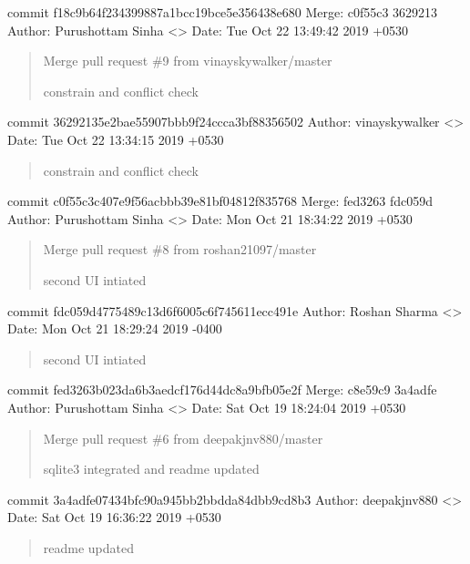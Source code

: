 \documentclass[letterpaper,10pt,english]{sphinxmanual}
\begin{document}
commit f18c9b64f234399887a1bcc19bce5e356438e680
Merge: c0f55c3 3629213
Author: Purushottam Sinha \textless{}\textgreater{}
Date:   Tue Oct 22 13:49:42 2019 +0530
\begin{quote}

Merge pull request \#9 from vinayskywalker/master

constrain and conflict check
\end{quote}

commit 36292135e2bae55907bbb9f24ccca3bf88356502
Author: vinayskywalker \textless{}\textgreater{}
Date:   Tue Oct 22 13:34:15 2019 +0530
\begin{quote}

constrain and conflict check
\end{quote}

commit c0f55c3c407e9f56acbbb39e81bf04812f835768
Merge: fed3263 fdc059d
Author: Purushottam Sinha \textless{}\textgreater{}
Date:   Mon Oct 21 18:34:22 2019 +0530
\begin{quote}

Merge pull request \#8 from roshan21097/master

second UI intiated
\end{quote}

commit fdc059d4775489c13d6f6005c6f745611ecc491e
Author: Roshan Sharma \textless{}\textgreater{}
Date:   Mon Oct 21 18:29:24 2019 -0400
\begin{quote}

second UI intiated
\end{quote}

commit fed3263b023da6b3aedcf176d44dc8a9bfb05e2f
Merge: c8e59c9 3a4adfe
Author: Purushottam Sinha \textless{}\textgreater{}
Date:   Sat Oct 19 18:24:04 2019 +0530
\begin{quote}

Merge pull request \#6 from deepakjnv880/master

sqlite3 integrated and readme updated
\end{quote}

commit 3a4adfe07434bfc90a945bb2bbdda84dbb9cd8b3
Author: deepakjnv880 \textless{}\textgreater{}
Date:   Sat Oct 19 16:36:22 2019 +0530
\begin{quote}

readme updated
\end{quote}
\end{document}
